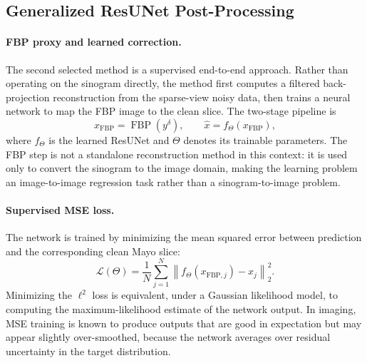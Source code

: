 \documentclass[11pt,a4paper]{article}
\begin{document}
\subsection{Generalized ResUNet Post-Processing}

\paragraph{FBP proxy and learned correction.}
The second selected method is a supervised end-to-end approach. Rather than
operating on the sinogram directly, the method first computes a filtered
back-projection reconstruction from the sparse-view noisy data, then trains a
neural network to map the FBP image to the clean slice. The two-stage pipeline
is
\begin{equation}
  x_{\mathrm{FBP}} = \operatorname{FBP}(y^{\delta}),
  \qquad
  \widehat{x} = f_\Theta(x_{\mathrm{FBP}}),
  \label{eq:resunet-mapping}
\end{equation}
where $f_\Theta$ is the learned ResUNet and $\Theta$ denotes its trainable
parameters. The FBP step is not a standalone reconstruction method in this
context: it is used only to convert the sinogram to the image domain, making
the learning problem an image-to-image regression task rather than a
sinogram-to-image problem.

\paragraph{Supervised MSE loss.}
The network is trained by minimizing the mean squared error between prediction
and the corresponding clean Mayo slice:
\begin{equation}
  \mathcal{L}(\Theta)
  =
  \frac{1}{N}
  \sum_{j=1}^{N}
  \left\|
  f_\Theta(x_{\mathrm{FBP},j}) - x_j
  \right\|_2^2.
  \label{eq:mse-loss}
\end{equation}
Minimizing the $\ell^2$ loss is equivalent, under a Gaussian likelihood model,
to computing the maximum-likelihood estimate of the network output. In imaging,
MSE training is known to produce outputs that are good in expectation but may
appear slightly over-smoothed, because the network averages over residual
uncertainty in the target distribution.
\end{document}

